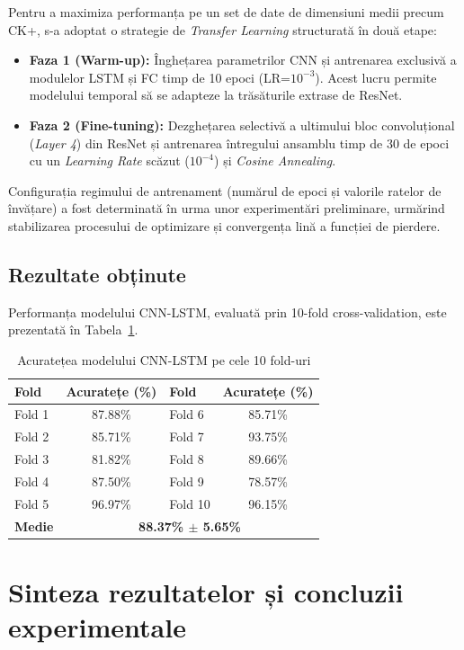 Pentru a maximiza performanța pe un set de date de dimensiuni medii precum CK+, s-a adoptat o strategie de \textit{Transfer Learning} structurată în două etape:
\begin{itemize}
	\item \textbf{Faza 1 (Warm-up):} Înghețarea parametrilor CNN și antrenarea exclusivă a modulelor LSTM și FC timp de 10 epoci (LR=$10^{-3}$). Acest lucru permite modelului temporal să se adapteze la trăsăturile extrase de ResNet.
	\item \textbf{Faza 2 (Fine-tuning):} Dezghețarea selectivă a ultimului bloc convoluțional (\textit{Layer 4}) din ResNet și antrenarea întregului ansamblu timp de 30 de epoci cu un \textit{Learning Rate} scăzut ($10^{-4}$) și \textit{Cosine Annealing}.
\end{itemize}
Configurația regimului de antrenament (numărul de epoci și valorile ratelor de învățare) a fost determinată în urma unor experimentări preliminare, urmărind stabilizarea procesului de optimizare și convergența lină a funcției de pierdere.

\subsection*{Rezultate obținute}

Performanța modelului CNN-LSTM, evaluată prin 10-fold cross-validation, este prezentată în Tabela~\ref{tab:rezultate_cnn_lstm}.

\begin{table}[h!]
	\centering
	\caption{Acuratețea modelului CNN-LSTM pe cele 10 fold-uri}
	\label{tab:rezultate_cnn_lstm}
	\begin{tabular}{@{}lc|lc@{}}
		\toprule
		\textbf{Fold} & \textbf{Acuratețe (\%)} & \textbf{Fold} & \textbf{Acuratețe (\%)} \\ \midrule
		Fold 1 & 87.88\% & Fold 6 & 85.71\% \\
		Fold 2 & 85.71\% & Fold 7 & 93.75\% \\
		Fold 3 & 81.82\% & Fold 8 & 89.66\% \\
		Fold 4 & 87.50\% & Fold 9 & 78.57\% \\
		Fold 5 & 96.97\% & Fold 10 & 96.15\% \\ \midrule
		\textbf{Medie} & \multicolumn{3}{c}{\textbf{88.37\% $\pm$ 5.65\%}} \\ \bottomrule
	\end{tabular}
\end{table}

\section{Sinteza rezultatelor și concluzii experimentale}

